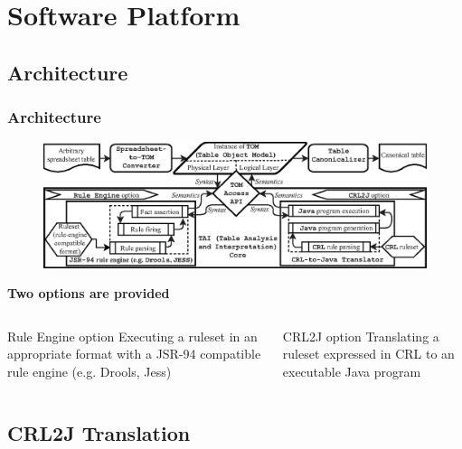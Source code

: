 \documentclass{beamer}
\begin{document}
\section{Software Platform}

\subsection{Architecture}

\begin{frame}
\frametitle{Architecture}
\begin{figure}
\includegraphics[width=1.0\linewidth]{architecture}
\end{figure}
\hspace*{\fill} \textbf{Two options are provided} \hspace*{\fill}
\begin{columns}
\begin{block}{\small Rule Engine option}
\small Executing a ruleset in an appropriate format with a JSR-94 compatible rule engine (e.g. Drools, Jess)
\end{block}
\begin{block}{\small CRL2J option}
\small Translating a ruleset expressed in CRL to an executable Java program
\end{block}
\end{columns}

\end{frame}

\subsection{CRL2J Translation}
\end{document}
